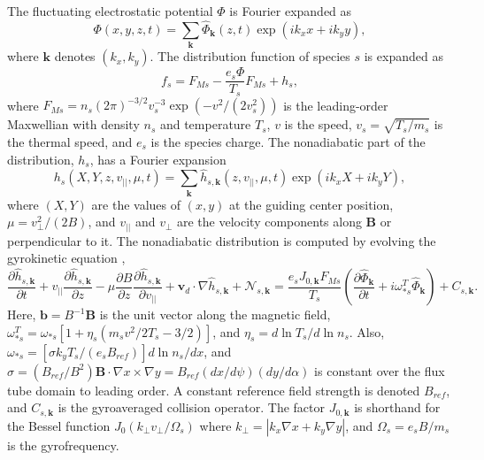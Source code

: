 \documentclass{jpp}
\begin{document}
The fluctuating electrostatic potential $\Phi$ is Fourier expanded as
\begin{equation}
    \Phi(x,y,z,t) = \sum_{\mathbf{k}}\hat{\Phi}_{\mathbf{k}}(z,t) \exp(i k_x x + i k_y y),
\end{equation}
where $\mathbf{k}$ denotes $(k_x,k_y)$.
The distribution function of species $s$ is expanded as
\begin{equation}
    f_s = F_{Ms} - \frac{e_s \Phi}{T_s} F_{Ms} + h_s,
    \label{eq:h_def}
\end{equation}
where $F_{Ms} = n_s (2\pi)^{-3/2} v_s^{-3} \exp(-v^2 / (2 v_s^2))$ is the leading-order Maxwellian with density $n_s$ and temperature $T_s$, $v$ is the speed, $v_s = \sqrt{T_s / m_s}$ is the thermal speed, and $e_s$ is the species charge.
The nonadiabatic part of the distribution, $h_s$, has a Fourier expansion
\begin{equation}
    h_s(X,Y,z,v_{||},\mu,t) = \sum_{\mathbf{k}}\hat{h}_{s,\mathbf{k}}(z,v_{||},\mu,t) \exp(i k_x X + i k_y Y),
\end{equation}
where $(X,Y)$ are the values of $(x,y)$ at the guiding center position, $\mu=v_{\perp}^2/(2B)$, and $v_{||}$ and $v_{\perp}$ are the velocity components along $\mathbf{B}$ or perpendicular to it.
The nonadiabatic distribution is computed by evolving the gyrokinetic equation \citep{frieman1982nonlinear},
\begin{equation}
    \frac{\partial \hat{h}_{s,\mathbf{k}}}{\partial t}
    + v_{||} \frac{\partial \hat{h}_{s,\mathbf{k}}}{\partial z}
    -\mu \frac{\partial B}{\partial z} \frac{\partial \hat{h}_{s,\mathbf{k}}}{\partial v_{||}}
    + \mathbf{v}_d \cdot\nabla \hat{h}_{s,\mathbf{k}}
    +\mathcal{N}_{s,\mathbf{k}}
    = \frac{e_s J_{0,\mathbf{k}} F_{Ms}}{T_s} 
    \left( \frac{\partial \hat{\Phi}_{\mathbf{k}}}{\partial t} + i \omega_{*s}^T \hat{\Phi}_{\mathbf{k}} \right)
    + C_{s,\mathbf{k}}.
    \label{eq:GKE}
\end{equation}
Here, $\mathbf{b}=B^{-1} \mathbf{B}$ is the unit vector along the magnetic field, $\omega_{*s}^T=\omega_{*s} [1 + \eta_s (m_s v^2 / 2 T_s - 3/2)]$, and $\eta_s = d \ln T_s / d \ln n_s$.
Also, $\omega_{*s}= [\sigma k_y T_s / (e_s B_{ref})] d \ln n_s / d x$, and $\sigma = (B_{ref}/B^2)\mathbf{B}\cdot\nabla x\times\nabla y = B_{ref}(dx/d\psi)(dy/d\alpha)$ is constant over the flux tube domain to leading order. 
A constant reference field strength is denoted $B_{ref}$, and $C_{s,\mathbf{k}}$ is the gyroaveraged collision operator.
The factor $J_{0,\mathbf{k}}$ is shorthand for the Bessel function $J_0(k_\perp v_\perp / \Omega_s)$ where $k_\perp = | k_x \nabla x + k_y \nabla y|$, and $\Omega_s=e_s B / m_s$ is the gyrofrequency.
\end{document}
